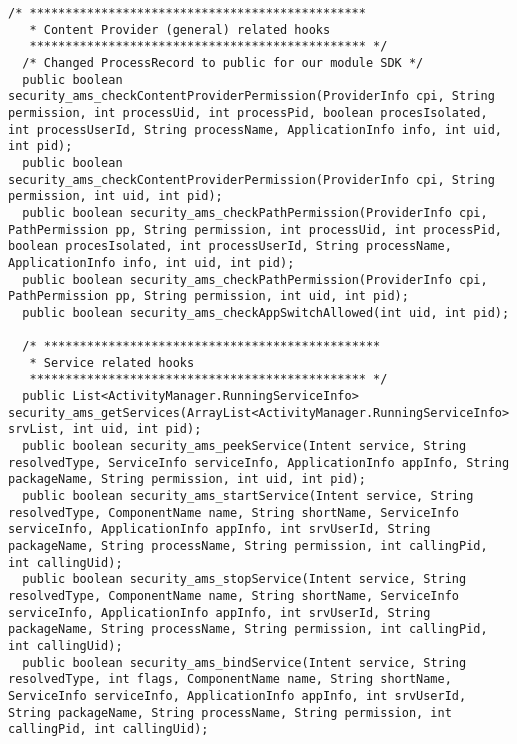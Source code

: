 \documentclass[letterpaper,twocolumn,10pt]{article}
\begin{document}
\begin{lstlisting}[emph={},basicstyle=\footnotesize,caption={Interface for Access Control Policy Modules}]
  /* ***********************************************
   * Content Provider (general) related hooks 
   *********************************************** */
  /* Changed ProcessRecord to public for our module SDK */
  public boolean security_ams_checkContentProviderPermission(ProviderInfo cpi, String permission, int processUid, int processPid, boolean procesIsolated, int processUserId, String processName, ApplicationInfo info, int uid, int pid);
  public boolean security_ams_checkContentProviderPermission(ProviderInfo cpi, String permission, int uid, int pid);
  public boolean security_ams_checkPathPermission(ProviderInfo cpi, PathPermission pp, String permission, int processUid, int processPid, boolean procesIsolated, int processUserId, String processName, ApplicationInfo info, int uid, int pid);
  public boolean security_ams_checkPathPermission(ProviderInfo cpi, PathPermission pp, String permission, int uid, int pid);
  public boolean security_ams_checkAppSwitchAllowed(int uid, int pid);
  
  /* ***********************************************
   * Service related hooks
   *********************************************** */
  public List<ActivityManager.RunningServiceInfo> security_ams_getServices(ArrayList<ActivityManager.RunningServiceInfo> srvList, int uid, int pid);
  public boolean security_ams_peekService(Intent service, String resolvedType, ServiceInfo serviceInfo, ApplicationInfo appInfo, String packageName, String permission, int uid, int pid);
  public boolean security_ams_startService(Intent service, String resolvedType, ComponentName name, String shortName, ServiceInfo serviceInfo, ApplicationInfo appInfo, int srvUserId, String packageName, String processName, String permission, int callingPid, int callingUid);
  public boolean security_ams_stopService(Intent service, String resolvedType, ComponentName name, String shortName, ServiceInfo serviceInfo, ApplicationInfo appInfo, int srvUserId, String packageName, String processName, String permission, int callingPid, int callingUid);
  public boolean security_ams_bindService(Intent service, String resolvedType, int flags, ComponentName name, String shortName, ServiceInfo serviceInfo, ApplicationInfo appInfo, int srvUserId, String packageName, String processName, String permission, int callingPid, int callingUid);
  

\end{lstlisting}
\end{document}
